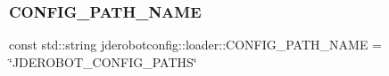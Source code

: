 \subsubsection{\texorpdfstring{C\+O\+N\+F\+I\+G\+\_\+\+P\+A\+T\+H\+\_\+\+N\+A\+ME}{CONFIG\_PATH\_NAME}}
{\footnotesize\ttfamily const std\+::string jderobotconfig\+::loader\+::\+C\+O\+N\+F\+I\+G\+\_\+\+P\+A\+T\+H\+\_\+\+N\+A\+ME = \char`\"{}J\+D\+E\+R\+O\+B\+O\+T\+\_\+\+C\+O\+N\+F\+I\+G\+\_\+\+P\+A\+T\+HS\char`\"{}}

